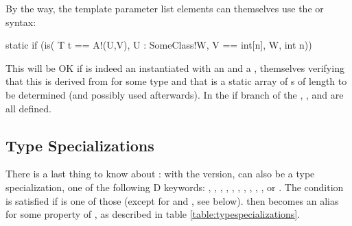 By the way, the template parameter list elements can themselves use the  or  syntax:

\begin{dcode}
static if (is( T t == A!(U,V), U : SomeClass!W, V == int[n], W, int n))
\end{dcode}

This will be OK if  is indeed an  instantiated with an  and a , themselves verifying that this  is derived from  for some  type and that  is a static array of s of length  to be determined (and possibly used afterwards). In the if branch of the  , ,  and  are all defined. 

\subsection{Type Specializations}\label{typespecializations}

There is a last thing to know about : with the  version,  can also be a type specialization, one of the following D keywords: , , , , , , , , , ,  or . The condition is satisfied if  is one of those (except for  and , see below).  then becomes an alias for some property of , as described in table \ref{table:typespecializations}.


